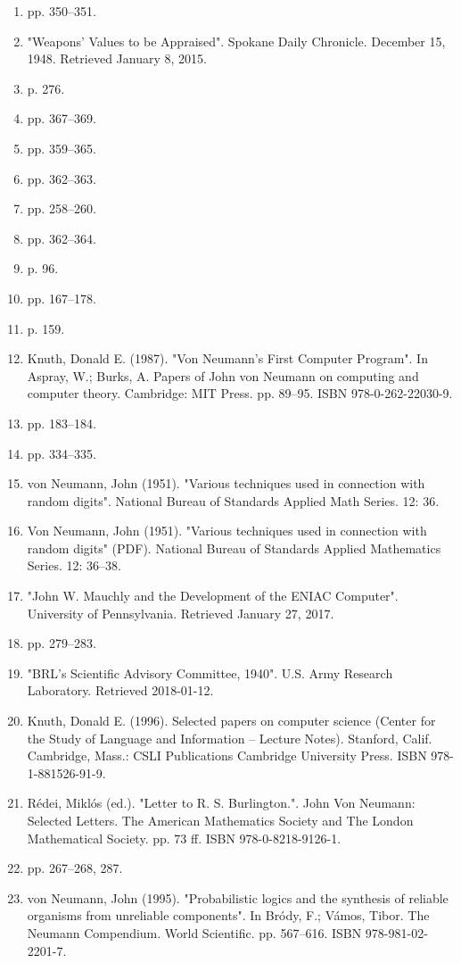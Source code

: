 \begin{enumerate}
\item  pp. 350–351.
\item "Weapons' Values to be Appraised". Spokane Daily Chronicle. December 15, 1948. Retrieved January 8, 2015.
\item  p. 276.
\item  pp. 367–369.
\item  pp. 359–365.
\item  pp. 362–363.
\item  pp. 258–260.
\item  pp. 362–364.
\item  p. 96.
\item  pp. 167–178.
\item  p. 159.
\item Knuth, Donald E. (1987). "Von Neumann's First Computer Program". In Aspray, W.; Burks, A. Papers of John von Neumann on computing and computer theory. Cambridge: MIT Press. pp. 89–95. ISBN 978-0-262-22030-9.
\item  pp. 183–184.
\item  pp. 334–335.
\item von Neumann, John (1951). "Various techniques used in connection with random digits". National Bureau of Standards Applied Math Series. 12: 36.
\item Von Neumann, John (1951). "Various techniques used in connection with random digits" (PDF). National Bureau of Standards Applied Mathematics Series. 12: 36–38.
\item "John W. Mauchly and the Development of the ENIAC Computer". University of Pennsylvania. Retrieved January 27, 2017.
\item  pp. 279–283.
\item "BRL's Scientific Advisory Committee, 1940". U.S. Army Research Laboratory. Retrieved 2018-01-12.
\item Knuth, Donald E. (1996). Selected papers on computer science (Center for the Study of Language and Information – Lecture Notes). Stanford, Calif. Cambridge, Mass.: CSLI Publications Cambridge University Press. ISBN 978-1-881526-91-9.
\item Rédei, Miklós (ed.). "Letter to R. S. Burlington.". John Von Neumann: Selected Letters. The American Mathematics Society and The London Mathematical Society. pp. 73 ff. ISBN 978-0-8218-9126-1.
\item  pp. 267–268, 287.
\item von Neumann, John (1995). "Probabilistic logics and the synthesis of reliable organisms from unreliable components". In Bródy, F.; Vámos, Tibor. The Neumann Compendium. World Scientific. pp. 567–616. ISBN 978-981-02-2201-7.

\end{enumerate}
